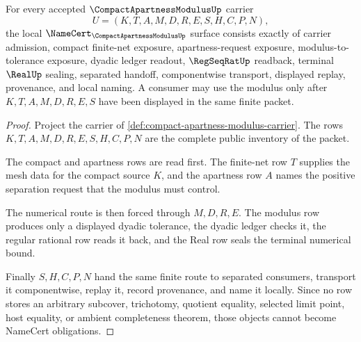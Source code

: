 \begin{theorem}
\label{thm:compact-apartness-modulus-namecert-obligations}
For every accepted $\CompactApartnessModulusUp$ carrier
$$
U=(K,T,A,M,D,R,E,S,H,C,P,N),
$$
the local $\NameCert_{\CompactApartnessModulusUp}$ surface consists exactly of carrier admission, compact finite-net exposure, apartness-request exposure, modulus-to-tolerance exposure, dyadic ledger readout, $\RegSeqRatUp$ readback, terminal $\RealUp$ sealing, separated handoff, componentwise transport, displayed replay, provenance, and local naming. A consumer may use the modulus only after $K,T,A,M,D,R,E,S$ have been displayed in the same finite packet.
\end{theorem}
\begin{proof}
Project the carrier of \autoref{def:compact-apartness-modulus-carrier}. The rows $K,T,A,M,D,R,E,S,H,C,P,N$ are the complete public inventory of the packet.

The compact and apartness rows are read first. The finite-net row $T$ supplies the mesh data for the compact source $K$, and the apartness row $A$ names the positive separation request that the modulus must control.

The numerical route is then forced through $M,D,R,E$. The modulus row produces only a displayed dyadic tolerance, the dyadic ledger checks it, the regular rational row reads it back, and the Real row seals the terminal numerical bound.

Finally $S,H,C,P,N$ hand the same finite route to separated consumers, transport it componentwise, replay it, record provenance, and name it locally. Since no row stores an arbitrary subcover, trichotomy, quotient equality, selected limit point, host equality, or ambient completeness theorem, those objects cannot become NameCert obligations.
\end{proof}

